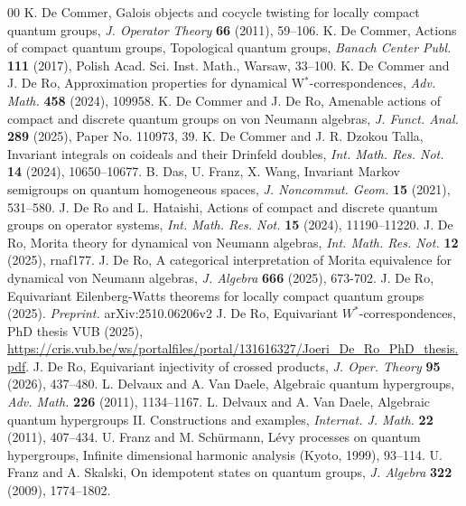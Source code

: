 \documentclass[reqno]{amsart}
\numberwithin{equation}{section}
\begin{document}
\begin{thebibliography}{00}
 K. De Commer, Galois objects and cocycle twisting for locally compact quantum groups, \emph{J. Operator Theory} \textbf{66} (2011), 59--106.
 K. De Commer, Actions of compact quantum groups, Topological quantum groups, \textit{Banach Center Publ.} \textbf{111} (2017), Polish Acad. Sci. Inst. Math., Warsaw, 33--100.
 K. De Commer and J. De Ro, Approximation properties for dynamical W$^*$-correspondences, \emph{Adv. Math.} \textbf{458} (2024), 109958.
 K. De Commer and J. De Ro, Amenable actions of compact and discrete quantum groups on von Neumann algebras, \emph{J. Funct. Anal.} \textbf{289} (2025), Paper No. 110973, 39.
 K. De Commer and J. R. Dzokou Talla, Invariant integrals on coideals and their Drinfeld doubles, \emph{Int. Math. Res. Not.} \textbf{14} (2024), 10650--10677.
 B. Das, U. Franz, X. Wang, Invariant Markov semigroups on quantum homogeneous spaces, \emph{J. Noncommut. Geom.} \textbf{15} (2021), 531--580.
 J. De Ro and L. Hataishi, Actions of compact and discrete quantum groups on operator systems, \emph{Int. Math. Res. Not.} \textbf{15} (2024), 11190–11220.
  J. De Ro, Morita theory for dynamical von Neumann algebras, \emph{Int. Math. Res. Not.} \textbf{12} (2025), rnaf177.
 J. De Ro, A categorical interpretation of Morita equivalence for dynamical von Neumann algebras, \emph{J. Algebra} \textbf{666} (2025), 673-702.
 J. De Ro, Equivariant Eilenberg-Watts theorems for locally compact quantum groups (2025).
\emph{Preprint.} arXiv:2510.06206v2
 J. De Ro, Equivariant $W^*$-correspondences, PhD thesis VUB (2025), \url{https://cris.vub.be/ws/portalfiles/portal/131616327/Joeri_De_Ro_PhD_thesis.pdf}.
 J. De Ro, Equivariant injectivity of crossed products, \emph{J. Oper. Theory} \textbf{95} (2026), 437--480.
 L. Delvaux and A. Van Daele, Algebraic quantum hypergroups, \emph{Adv. Math.} \textbf{226} (2011), 1134--1167.
 L. Delvaux and A. Van Daele, Algebraic quantum hypergroups {II}. {C}onstructions and examples, \emph{Internat. J. Math.} \textbf{22} (2011), 407--434.
 U. Franz and M. Sch\"urmann, L\'evy processes on quantum hypergroups, Infinite dimensional harmonic analysis ({K}yoto, 1999), 93--114.
 U. Franz and A. Skalski, On idempotent states on quantum groups, \emph{J. Algebra} \textbf{322} (2009), 1774--1802.

\end{thebibliography}
\end{document}

